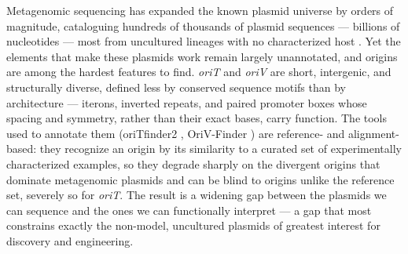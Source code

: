 Metagenomic sequencing has expanded the known plasmid universe by orders of
magnitude, cataloguing hundreds of thousands of plasmid sequences --- billions
of nucleotides --- most from uncultured lineages with no characterized host
\cite{camargo2024img}. Yet the elements that make these plasmids work remain
largely unannotated, and origins are among the hardest features to find.
\emph{oriT} and \emph{oriV} are short, intergenic, and structurally diverse,
defined less by conserved sequence motifs than by architecture --- iterons,
inverted repeats, and paired promoter boxes whose spacing and symmetry,
rather than their exact bases, carry function. The tools used to annotate
them (oriTfinder2 \cite{liu2025oritdb,li2018oritfinder}, OriV-Finder
\cite{li2025orivfinder}) are reference- and alignment-based: they recognize an origin by its
similarity to a curated set of experimentally characterized examples, so they
degrade sharply on the divergent origins that dominate metagenomic plasmids
and can be blind to origins unlike the reference set, severely so for
\emph{oriT}. The result is
a widening gap between the plasmids we can sequence and the ones we can
functionally interpret --- a gap that most constrains exactly the non-model,
uncultured plasmids of greatest interest for discovery and engineering.


